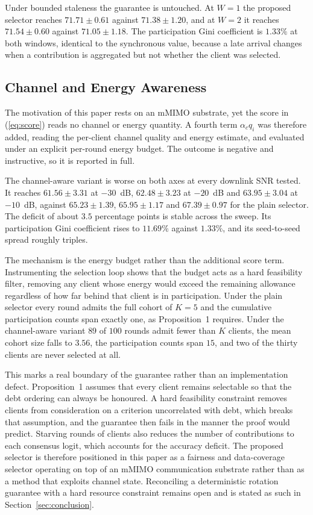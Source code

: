 \documentclass[journal]{IEEEtran}
\begin{document}
{Under bounded staleness the guarantee is untouched. At $W = 1$ the proposed selector reaches $71.71 \pm 0.61$ against $71.38 \pm 1.20$, and at $W = 2$ it reaches $71.54 \pm 0.60$ against $71.05 \pm 1.18$. The participation Gini coefficient is $1.33\%$ at both windows, identical to the synchronous value, because a late arrival changes when a contribution is aggregated but not whether the client was selected.

\subsection{Channel and Energy Awareness}
\label{ssec:exp-channel-aware}

The motivation of this paper rests on an mMIMO substrate, yet the score in (\ref{eq:score}) reads no channel or energy quantity. A fourth term $\alpha_c q_i$ was therefore added, reading the per-client channel quality and energy estimate, and evaluated under an explicit per-round energy budget. The outcome is negative and instructive, so it is reported in full.

The channel-aware variant is worse on both axes at every downlink SNR tested. It reaches $61.56 \pm 3.31$ at $-30$~dB, $62.48 \pm 3.23$ at $-20$~dB and $63.95 \pm 3.04$ at $-10$~dB, against $65.23 \pm 1.39$, $65.95 \pm 1.17$ and $67.39 \pm 0.97$ for the plain selector. The deficit of about $3.5$ percentage points is stable across the sweep. Its participation Gini coefficient rises to $11.69\%$ against $1.33\%$, and its seed-to-seed spread roughly triples.

The mechanism is the energy budget rather than the additional score term. Instrumenting the selection loop shows that the budget acts as a hard feasibility filter, removing any client whose energy would exceed the remaining allowance regardless of how far behind that client is in participation. Under the plain selector every round admits the full cohort of $K = 5$ and the cumulative participation counts span exactly one, as Proposition~1 requires. Under the channel-aware variant $89$ of $100$ rounds admit fewer than $K$ clients, the mean cohort size falls to $3.56$, the participation counts span $15$, and two of the thirty clients are never selected at all.

This marks a real boundary of the guarantee rather than an implementation defect. Proposition~1 assumes that every client remains selectable so that the debt ordering can always be honoured. A hard feasibility constraint removes clients from consideration on a criterion uncorrelated with debt, which breaks that assumption, and the guarantee then fails in the manner the proof would predict. Starving rounds of clients also reduces the number of contributions to each consensus logit, which accounts for the accuracy deficit. The proposed selector is therefore positioned in this paper as a fairness and data-coverage selector operating on top of an mMIMO communication substrate rather than as a method that exploits channel state. Reconciling a deterministic rotation guarantee with a hard resource constraint remains open and is stated as such in Section~\ref{sec:conclusion}.

}
\end{document}
